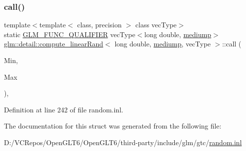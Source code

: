 \subsubsection{\texorpdfstring{call()}{call()}}
{\footnotesize\ttfamily template$<$template$<$ class, precision $>$ class vec\+Type$>$ \\
static \mbox{\hyperlink{setup_8hpp_a33fdea6f91c5f834105f7415e2a64407}{G\+L\+M\+\_\+\+F\+U\+N\+C\+\_\+\+Q\+U\+A\+L\+I\+F\+I\+ER}} vec\+Type$<$long double, \mbox{\hyperlink{namespaceglm_a0f04f086094c747d227af4425893f545a6416f3ea0c9025fb21ed50c4d6620482}{mediump}}$>$ \mbox{\hyperlink{structglm_1_1detail_1_1compute__linear_rand}{glm\+::detail\+::compute\+\_\+linear\+Rand}}$<$ long double, \mbox{\hyperlink{namespaceglm_a0f04f086094c747d227af4425893f545a6416f3ea0c9025fb21ed50c4d6620482}{mediump}}, vec\+Type $>$\+::call (\begin{DoxyParamCaption}\item[{vec\+Type$<$ long double, \mbox{\hyperlink{namespaceglm_a0f04f086094c747d227af4425893f545a6416f3ea0c9025fb21ed50c4d6620482}{mediump}} $>$ const \&}]{Min,  }\item[{vec\+Type$<$ long double, \mbox{\hyperlink{namespaceglm_a0f04f086094c747d227af4425893f545a6416f3ea0c9025fb21ed50c4d6620482}{mediump}} $>$ const \&}]{Max }\end{DoxyParamCaption})\hspace{0.3cm}{\ttfamily [inline]}, {\ttfamily [static]}}



Definition at line 242 of file random.\+inl.



The documentation for this struct was generated from the following file\+:\begin{DoxyCompactItemize}
\item 
D\+:/\+V\+C\+Repos/\+Open\+G\+L\+T6/\+Open\+G\+L\+T6/third-\/party/include/glm/gtc/\mbox{\hyperlink{random_8inl}{random.\+inl}}\end{DoxyCompactItemize}
